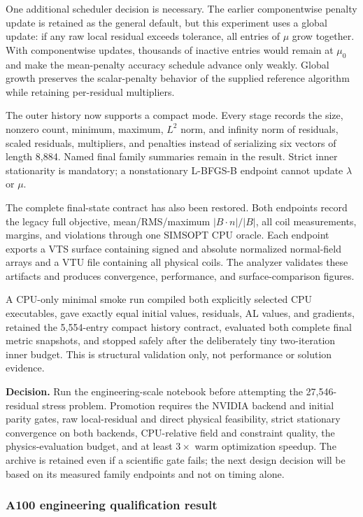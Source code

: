 \documentclass[11pt,a4paper]{article}
\begin{document}
One additional scheduler decision is necessary.  The earlier componentwise
penalty update is retained as the general default, but this experiment uses a
global update: if any raw local residual exceeds tolerance, all entries of
$\mu$ grow together.  With componentwise updates, thousands of inactive entries
would remain at $\mu_0$ and make the mean-penalty accuracy schedule advance only
weakly.  Global growth preserves the scalar-penalty behavior of the supplied
reference algorithm while retaining per-residual multipliers.

The outer history now supports a compact mode.  Every stage records the size,
nonzero count, minimum, maximum, $L^2$ norm, and infinity norm of residuals,
scaled residuals, multipliers, and penalties instead of serializing six vectors
of length 8,884.  Named final family summaries remain in the result.  Strict
inner stationarity is mandatory; a nonstationary L-BFGS-B endpoint cannot
update $\lambda$ or $\mu$.

The complete final-state contract has also been restored.  Both endpoints
record the legacy full objective, mean/RMS/maximum
$|B\cdot n|/|B|$, all coil measurements, margins, and violations through one
SIMSOPT CPU oracle.  Each endpoint exports a VTS surface containing signed and
absolute normalized normal-field arrays and a VTU file containing all physical
coils.  The analyzer validates these artifacts and produces convergence,
performance, and surface-comparison figures.

A CPU-only minimal smoke run compiled both explicitly selected CPU executables,
gave exactly equal initial values, residuals, AL values, and gradients, retained
the 5,554-entry compact history contract, evaluated both complete final metric
snapshots, and stopped safely after the deliberately tiny two-iteration inner
budget.  This is structural validation only, not performance or solution
evidence.

\textbf{Decision.}  Run the engineering-scale notebook before attempting the
27,546-residual stress problem.  Promotion requires the NVIDIA backend and
initial parity gates, raw local-residual and direct physical feasibility,
strict stationary convergence on both backends, CPU-relative field and
constraint quality, the physics-evaluation budget, and at least $3\times$ warm
optimization speedup.  The archive is retained even if a scientific gate fails;
the next design decision will be based on its measured family endpoints and
not on timing alone.

\subsubsection{A100 engineering qualification result}
\end{document}
